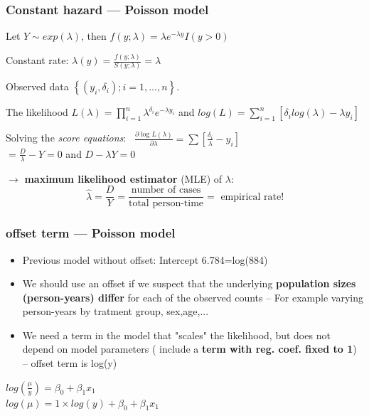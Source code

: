 \documentclass[handout,12pt,dvipsnames,t]{beamer}
\begin{document}
\begin{frame}[fragile]
\frametitle{Constant hazard --- Poisson model}

Let $Y\sim exp(\lambda)$, then $f(y;\lambda)=\lambda e^{-\lambda y} I(y > 0 )$

Constant rate: $\lambda(y)=\frac{f(y;\lambda)}{S(y;\lambda)}=\lambda$

Observed data $ \left\{ (y_i,\delta_i); i=1,...,n \right\}$.

The likelihood \vspace*{0.2in} $L(\lambda)=\prod_{i=1}^{n} \lambda^{\delta_i} e^{-\lambda y_i}$ and $log(L)= \sum_{i=1}^{n} \left[  \delta_i log(\lambda)-\lambda y_i \right]$

Solving the {\it score equations}: \ $\frac{\partial \log L(\lambda)}{\partial \lambda} = \sum \left[  \frac{\delta_i}{\lambda} -y_i \right] $ \\ %
 $=  \frac{D}{\lambda} - Y = 0 $ and $  D-\lambda Y   =  0   $

$\rightarrow$
{\bf maximum likelihood estimator} (MLE) of $\lambda$:
$$
 \widehat\lambda = \frac{D}{Y}  =
  \frac{\mbox{number of cases}}
  {\mbox{total person-time}}
  = \mbox{ empirical rate!}
$$
\end{frame}

\begin{frame}[fragile]
\frametitle{offset term --- Poisson model}

\begin{itemize}
\item Previous model without offset: Intercept 6.784=log(884)

\item We should use an offset if we suspect that the
underlying \textbf{population sizes (person-years) differ }
for each of the observed counts -- For example varying person-years by tratment group, sex,age,... 

\item We need a term in the model that "scales" the likelihood, but does not depend on model parameters ( include a \textbf{term with reg. coef. fixed to 1}) -- offset term is log(y)
\end{itemize}

\begin{center}
$log(\frac{\mu}{y})=\beta_0+\beta_1 x_1$ \\
$log(\mu)=1 \times log(y)+\beta_0+\beta_1 x_1$
\end{center}
\end{frame}
\end{document}
